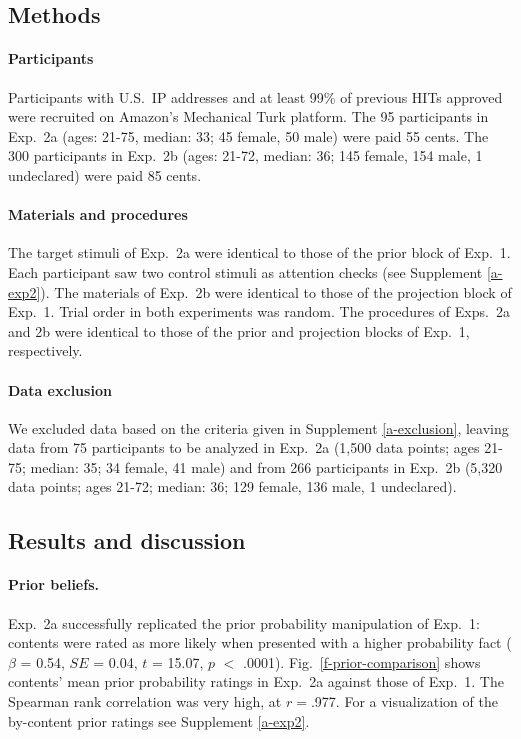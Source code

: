 \documentclass[11pt,fleqn]{article}
\newcommand{\figref}[1]{Fig.~\ref{#1}}
\newcommand{\6}{\mbox{$[\hspace*{-.6mm}[$}}
\newcommand{\9}{\mbox{$]\hspace*{-.6mm}]$}}
\begin{document}
\subsection{Methods}


\paragraph{Participants} Participants with U.S.\ IP addresses and at least 99\% of previous HITs approved were recruited on Amazon's Mechanical Turk platform. The 95 participants in Exp.~2a (ages: 21-75, median: 33; 45 female, 50 male) were paid 55 cents. The 300 participants in Exp.~2b (ages: 21-72, median: 36; 145 female, 154 male, 1 undeclared) were paid 85 cents.

\paragraph{Materials and procedures} The target stimuli of Exp.~2a were identical to those of the prior block of Exp.~1. Each participant saw two control stimuli as attention checks (see Supplement \ref{a-exp2}). The materials of Exp.~2b were identical to those of the projection block of Exp.~1. Trial order in both experiments was random. The procedures of Exps.~2a and 2b were identical to those of the prior and projection blocks of Exp.~1, respectively.

\paragraph{Data exclusion} We excluded data based on the criteria given in Supplement \ref{a-exclusion}, leaving data from 75 participants to be analyzed in Exp.~2a (1,500 data points; ages 21-75; median: 35; 34 female, 41 male) and from 266 participants in Exp.~2b (5,320 data points; ages 21-72; median: 36; 129 female, 136 male, 1 undeclared).

\subsection{Results and discussion}

\paragraph{Prior beliefs.} Exp.~2a successfully replicated the prior probability manipulation of Exp.~1: contents were rated as more likely when presented with a higher probability fact ($\beta$ = 0.54, $SE$ = 0.04, $t$ = 15.07, $p$ $<$ .0001).  \figref{f-prior-comparison} shows contents' mean prior probability ratings in Exp.~2a against those of Exp.~1. The Spearman rank correlation was very high, at $r=$.977. For a visualization of the by-content prior ratings see Supplement \ref{a-exp2}.
\end{document}
